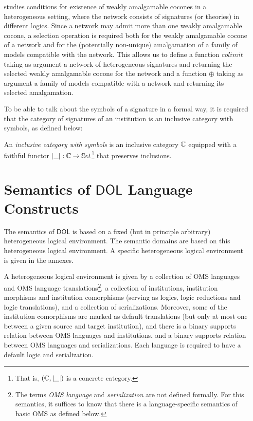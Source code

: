 \documentclass[10pt,fleqn,final]{scrreprt}
\newcommand{\cbs}[0]{\color{red}\xspace} %
\newcommand{\cbe}[0]{\color{black}\xspace} %
\newcommand*{\termref}[1]{\index{#1}#1\xspace}
\newcommand*{\DOL}{\ensuremath{\mathsf{DOL}}\xspace}
\newcommand{\sclause}[1]{\section{#1}}
\newenvironment{definitions}[0]{\medskip }{}
\begin{document}
\begin{definitions}
\cite{weakcol} studies conditions for existence of weakly amalgamable cocones
in a heterogeneous setting, where the network consists of signatures (or theories)
in different logics. Since a network may admit more than one weakly amalgamable cocone,\cbs
a selection operation is required\cbe both for the weakly amalgamable cocone of a network 
and for the (potentially non-unique) amalgamation of a family of models compatible with the
network. This allows us to define a function
$colimit$ taking as argument a network of heterogeneous signatures and
returning the selected weakly amalgamable cocone for the network and
a function $\oplus$ taking as argument a family of models compatible with a network
and returning its selected amalgamation.

\cbs To be able to talk about the symbols of a signature in a formal way, it is required that the\cbe category of signatures of an institution is 
an inclusive category with symbols, as defined below:
\begin{definition}
An \emph{inclusive category with symbols} is an inclusive category
$\mathbb{C}$ equipped with a faithful functor $|\_|:\mathbb{C}\to\mathbb{S}et$\footnote{That is,
$(\mathbb{C},|\_|)$ is a concrete category.} that preserves
inclusions.
\end{definition}

\sclause{Semantics of \DOL Language Constructs}\label{c:direct-sematics}

The semantics of \DOL is based on a fixed (but in principle arbitrary) heterogeneous logical 
environment.  The semantic domains are based on this heterogeneous logical environment. 
A specific heterogeneous logical environment is given in the annexes.

A heterogeneous logical environment is given by a collection of
OMS languages and OMS language translations\footnote{The
  terms \emph{OMS language} and \emph{serialization} are not
  defined formally. For this semantics, it suffices to know that there
  is a language-specific semantics of basic OMS as defined
  below.}, a collection of institutions, \termref{institution} morphisms and
institution comorphisms (serving as logics, logic reductions and logic
translations), and a collection of serializations. Moreover, some of the institution comorphisms are marked as default translations (but only at most one between a given source and target institution), and there is
a binary supports relation between OMS languages and institutions,
and a binary supports relation between OMS languages and
serializations. 
\cbs Each language is required to have a default logic and serialization.\cbe



\end{definitions}
\end{document}
